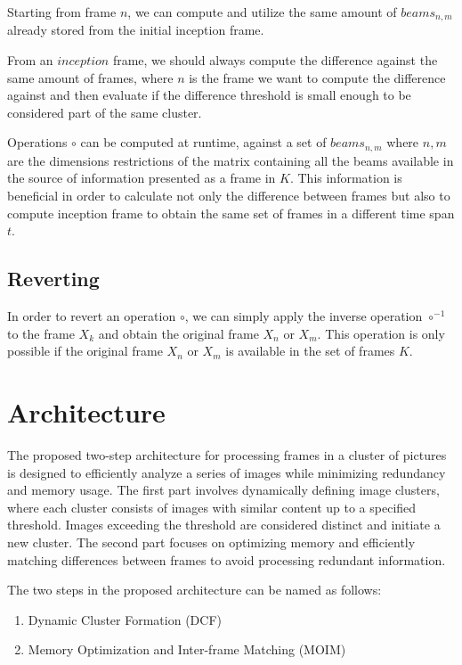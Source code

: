 \documentclass[twocolumn]{article}
\begin{document}
Starting from frame $n$, we can compute and utilize the same amount of $beams_{n,m}$ already stored from the initial inception frame. 

From an $inception$ frame, we should always compute the difference against the same amount of frames, where $n$ is the frame we want to compute the difference against and then evaluate if the difference threshold is small enough to be considered part of the same cluster.

Operations $\circ$ can be computed at runtime, against a set of $beams_{n,m}$ where $n,m$ are the dimensions restrictions of the matrix containing all the beams available in the source of information presented as a frame in $K$. This information is beneficial in order to calculate not only the difference between frames but also to compute inception frame to obtain the same set of frames in a different time span $t$.

\subsection{Reverting}
In order to revert an operation $\circ$, we can simply apply the inverse operation $\circ^{-1}$ to the frame $X_{k}$ and obtain the original frame $X_{n}$ or $X_{m}$. This operation is only possible if the original frame $X_{n}$ or $X_{m}$ is available in the set of frames $K$.

\section{Architecture}
The proposed two-step architecture for processing frames in a cluster of pictures is designed to efficiently analyze a series of images while minimizing redundancy and memory usage. The first part involves dynamically defining image clusters, where each cluster consists of images with similar content up to a specified threshold. Images exceeding the threshold are considered distinct and initiate a new cluster. The second part focuses on optimizing memory and efficiently matching differences between frames to avoid processing redundant information.

The two steps in the proposed architecture can be named as follows:

\begin{enumerate}
    \item Dynamic Cluster Formation (DCF)
    \item Memory Optimization and Inter-frame Matching (MOIM)
\end{enumerate}
\end{document}
